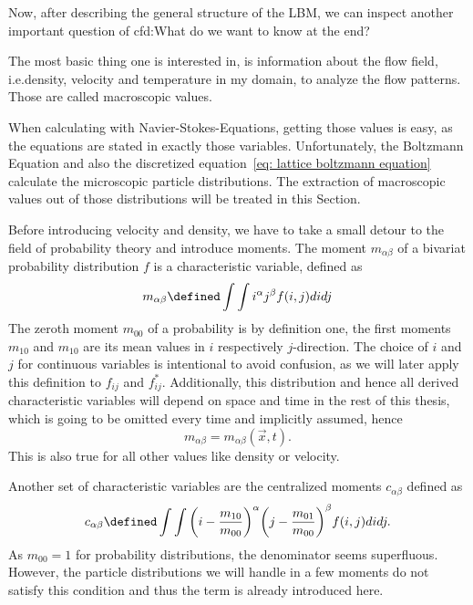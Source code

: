 Now, after describing the general structure of the LBM, we can inspect another important question of \gls{cfd}:\@ What do we want to know at the end?

The most basic thing one is interested in, is information about the flow field, i.e.\@ density, velocity and temperature in my domain, to analyze the flow patterns.
Those are called macroscopic values.

When calculating with Navier-Stokes-Equations, getting those values is easy, as the equations are stated in exactly those variables.
Unfortunately, the Boltzmann Equation and also the discretized equation~\eqref{eq: lattice boltzmann equation} calculate the microscopic particle distributions.
The extraction of macroscopic values out of those distributions will be treated in this Section.

Before introducing velocity and density, we have to take a small detour to the field of probability theory and introduce moments.
The moment $m_{\alpha\beta}$ of a bivariat probability distribution $f$ is a characteristic variable, defined as
\begin{equation}
  \label{eq: moments continuous}
  m_{\alpha\beta} \defined \int\int i^\alpha j^\beta f(i,j) didj
\end{equation}
The zeroth moment $m_{00}$ of a probability is by definition one, the first moments $m_{10}$ and $m_{10}$ are its mean values in $i$ respectively $j$-direction.
The choice of $i$ and $j$ for continuous variables is intentional to avoid confusion, as we will later apply this definition to $f_{ij}$ and $f_{ij}^*$.
Additionally, this distribution and hence all derived characteristic variables will depend on space and time in the rest of this thesis, which is going to be omitted every time and implicitly assumed, hence
\begin{equation}
  m_{\alpha\beta} = m_{\alpha\beta}(\vec{x},t).
\end{equation}
This is also true for all other values like density or velocity.

Another set of characteristic variables are the centralized moments $c_{\alpha\beta}$ defined as
\begin{equation}
  \label{eq: central moments continuous}
  c_{\alpha\beta} \defined \int\int {\left(i - \frac{m_{10}}{m_{00}}\right)}^\alpha {\left(j-\frac{m_{01}}{m_{00}}\right)}^\beta f(i,j) didj.
\end{equation}
As $m_{00}=1$ for probability distributions, the denominator seems superfluous.
However, the particle distributions we will handle in a few moments do not satisfy this condition and thus the term is already introduced here.


